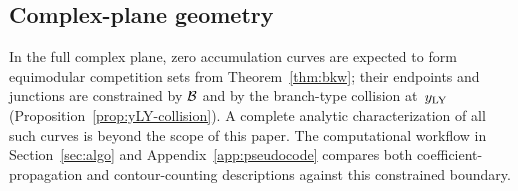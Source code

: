 \subsection{Complex-plane geometry}

\noindent
In the full complex plane, zero accumulation curves are expected to form equimodular competition sets from Theorem~\ref{thm:bkw}; their endpoints and junctions are constrained by \(\mathcal{B}\) and by the branch-type collision at~\(y_{\mathrm{LY}}\) (Proposition~\ref{prop:yLY-collision}).
A complete analytic characterization of all such curves is beyond the scope of this paper.
The computational workflow in Section~\ref{sec:algo} and Appendix~\ref{app:pseudocode} compares both coefficient-propagation and contour-counting descriptions against this constrained boundary.
